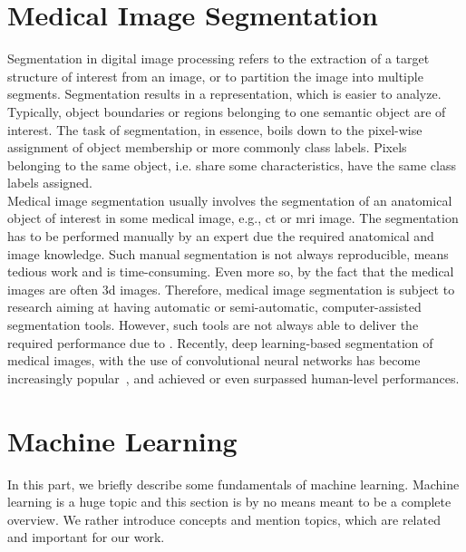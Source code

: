 \section{Medical Image Segmentation} \label{sec:intro_mia} %
Segmentation in digital image processing refers to the extraction of a target structure of interest from an image, or to partition the image into multiple segments. Segmentation results in a representation, which is easier to analyze. Typically, object boundaries or regions belonging to one semantic object are of interest. The task of segmentation, in essence, boils down to the pixel-wise assignment of object membership or more commonly class labels. Pixels belonging to the same object, i.e. share some characteristics, have the same class labels assigned.\\
Medical image segmentation usually involves the segmentation of an anatomical object of interest in some medical image, e.g., \gls{ct} or \gls{mri} image. The segmentation has to be performed manually by an expert due the required anatomical and image knowledge. Such manual segmentation is not always reproducible, means tedious work and is time-consuming. Even more so, by the fact that the medical images are often \gls{3d} images. Therefore, medical image segmentation is subject to research aiming at having automatic or semi-automatic, computer-assisted segmentation tools. However, such tools are not always able to deliver the required performance due to . Recently, deep learning-based segmentation of medical images, with the use of convolutional neural networks has become increasingly popular~\cite{Ronneberger2015U-Net:Segmentation,Tetteh2018DeepVesselNet:Volumes,Cicek20163DAnnotation,Baumgartner2017AnSegmentation,Meng2017TrackingNetwork,Milletari2016V-Net:Segmentation,BalsigerContext-awareNeurography,Kayalibay2017CNN-basedData}, and achieved or even surpassed human-level performances.

\section{Machine Learning} \label{sec:intro_mlearn} %
In this part, we briefly describe some fundamentals of machine learning. Machine learning is a huge topic and this section is by no means meant to be a complete overview. We rather introduce concepts and mention topics, which are related and important for our work.

